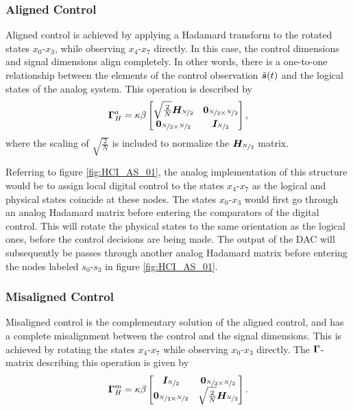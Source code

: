 \subsubsection*{Aligned Control}
Aligned control is achieved by applying a Hadamard transform to the rotated states $x_0$-$x_3$, while observing $x_4$-$x_7$ directly. In this case, the control dimensions and signal dimensions align completely. In other words, there is a one-to-one relationship between the elements of the control observation $\tilde{\bm{s}}(t)$ and the logical states of the analog system. This operation is described by
\begin{equation}
    \bm{\Gamma}_{H}^a =
    \kappa\beta  \begin{bmatrix}
        \sqrt{\frac{2}{N}}\bm{H_}{\nicefrac{N}{2}}    & \bm{0}_{\nicefrac{N}{2} \times \nicefrac{N}{2}} \\
        \bm{0}_{\nicefrac{N}{2} \times \nicefrac{N}{2}}  & \bm{I}_{\nicefrac{N}{2}}
    \end{bmatrix},
\end{equation}
where the scaling of $\sqrt{\frac{2}{N}}$ is included to normalize the $\bm{H_}{\nicefrac{N}{2}}$ matrix.


Referring to figure \ref{fig:HCI_AS_01}, the analog implementation of this structure would be to assign local digital control to the states $x_4$-$x_7$ as the logical and physical states coincide at these nodes. The states $x_0$-$x_3$ would first go through an analog Hadamard matrix before entering the comparators of the digital control. This will rotate the physical states to the same orientation as the logical ones, before the control decisions are being made. The output of the DAC will subsequently be passes through another analog Hadamard matrix before entering the nodes labeled $s_0$-$s_3$ in figure \ref{fig:HCI_AS_01}.


\subsubsection*{Misaligned Control}
Misaligned control is the complementary solution of the aligned control, and has a complete misalignment between the control and the signal dimensions. This is achieved by rotating the states $x_4$-$x_7$ while observing $x_0$-$x_3$ directly. The $\bm{\Gamma}$-matrix describing this operation is given by
\begin{equation}
    \bm{\Gamma}_{H}^m =
    \kappa\beta \begin{bmatrix}
        \bm{I}_{\nicefrac{N}{2}}    & \bm{0}_{\nicefrac{N}{2} \times \nicefrac{N}{2}} \\
        \bm{0}_{\nicefrac{N}{2} \times \nicefrac{N}{2}}    & \sqrt{\frac{2}{N}}\bm{H_}{\nicefrac{N}{2}}
    \end{bmatrix}.
\end{equation}

